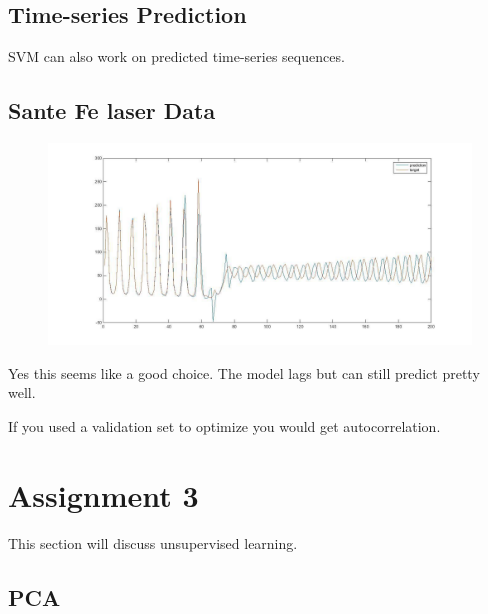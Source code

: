\documentclass[11pt,oneside,a4paper]{article}
\begin{document}
\subsection{Time-series Prediction}
SVM can also work on predicted time-series sequences. 

\subsection{Sante Fe laser Data}

\begin{figure}[H]
	\centering
	\includegraphics[scale=.5]{../Figures/sante_fe}
\end{figure}

Yes this seems like a good choice. The model lags but can still predict pretty well.

If you used a validation set to optimize you would get autocorrelation. 
\section{Assignment 3}

This section will discuss unsupervised learning.

\subsection{PCA}
\end{document}
